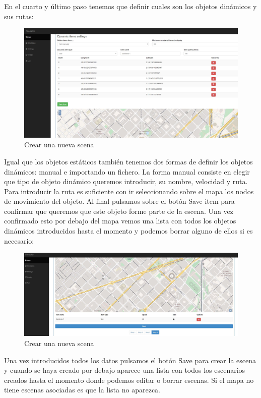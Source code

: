En el cuarto y último paso tenemos que definir cuales son los objetos dinámicos y sus rutas:

\begin{figure}[H]
	\centering\includegraphics[scale=0.3]{imagenes/capitulo9/crear-escena-4.jpg}
	\caption{Crear una nueva scena}
	\label{img:AddScena4}
\end{figure}

Igual que los objetos estáticos también tenemos dos formas de definir los objetos dinámicos: manual e importando un fichero. La forma manual consiste en elegir que tipo de objeto dinámico queremos introducir, su nombre, velocidad y ruta. Para introducir la ruta es suficiente con ir seleccionando sobre el mapa los nodos de movimiento del objeto. Al final pulsamos sobre el botón Save item para confirmar que queremos que este objeto forme parte de la escena. Una vez confirmado esto por debajo del mapa vemos una lista con todos los objetos dinámicos introducidos hasta el momento y podemos borrar alguno de ellos si es necesario:

\begin{figure}[H]
	\centering\includegraphics[scale=0.2]{imagenes/capitulo9/crear-escena-4-1.jpg}
	\caption{Crear una nueva scena}
	\label{img:AddScena41}
\end{figure}

Una vez introducidos todos los datos pulsamos el botón Save para crear la escena y cuando se haya creado por debajo aparece una lista con todos los escenarios creados hasta el momento donde podemos editar o borrar escenas. Si el mapa no tiene escenas asociadas es que la lista no aparezca.

